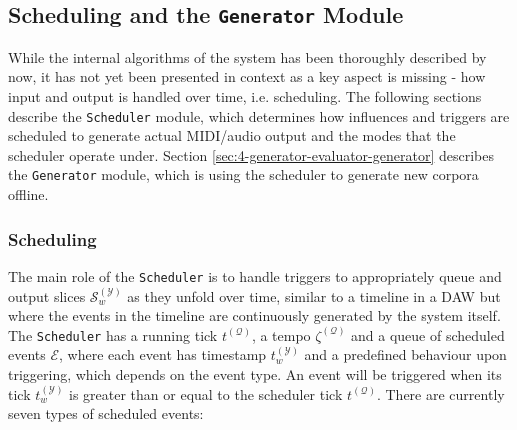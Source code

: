 \subsection{Scheduling and the \texttt{Generator} Module}\label{sec:4-generator-evaluator}
While the internal algorithms of the system has been thoroughly described by now, it has not yet been presented in context as a key aspect is missing - how input and output is handled over time, i.e. scheduling. The following sections describe the \texttt{Scheduler} module, which determines how influences and triggers are scheduled to generate actual MIDI/audio output and the modes that the scheduler operate under. Section \ref{sec:4-generator-evaluator-generator} describes the \texttt{Generator} module, which is using the scheduler to generate new corpora offline.

\subsubsection{Scheduling}\label{sec:4-generator-evaluator-scheduler}
The main role of the \texttt{Scheduler} is to handle triggers to appropriately queue and output slices $\mathcal S^{(\mathcal Y)}_w$ as they unfold over time, similar to a timeline in a DAW but where the events in the timeline are continuously generated by the system itself. The \texttt{Scheduler} has a running tick $t^{(\mathcal Q)}$, a tempo $\zeta^{(\mathcal Q)}$ and a queue of scheduled events $\mathcal E$, where each event has timestamp $t^{(\mathcal Y)}_w$ and a predefined behaviour upon triggering, which depends on the event type. An event will be triggered when its tick $t^{(\mathcal Y)}_w$ is greater than or equal to the scheduler tick $t^{(\mathcal Q)}$. There are currently seven types of scheduled events:

